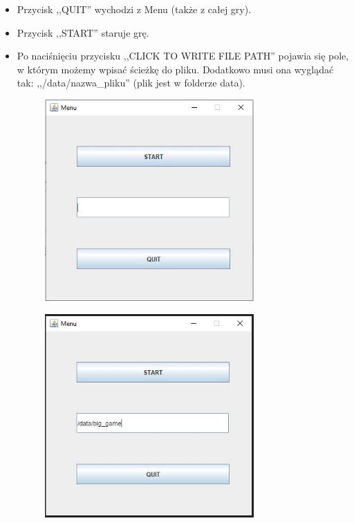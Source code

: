 \documentclass{article}
\begin{document}
\begin{itemize}
    \item Przycisk ,,QUIT'' wychodzi z Menu (także z całej gry).
    \item Przycisk ,,START'' staruje grę.
    \item Po naciśnięciu przycisku ,,CLICK TO WRITE FILE PATH'' pojawia się pole, w którym możemy wpisać ścieżkę do pliku. Dodatkowo musi ona wyglądać tak: ,,/data/nazwa\_pliku'' (plik jest w folderze data).
    
    \clearpage
    
    \begin{figure} [hbt!]
    \includegraphics[width=8cm,center]{images/menu_path.JPG}
    \end{figure}
    
    \begin{figure} [hbt!]
    \includegraphics[width=8cm,center]{images/menu_path2.JPG}
    \end{figure}
    
\end{itemize}
\end{document}
